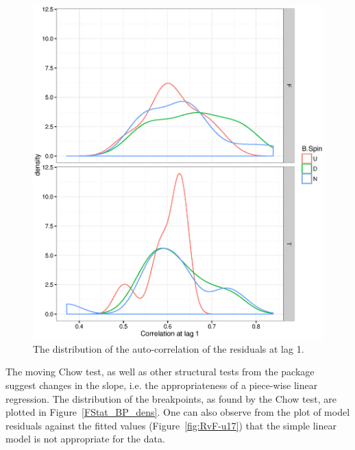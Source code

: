 \documentclass{report}
\begin{document}
\begin{figure}
	\centering
	\includegraphics{ACF1_dens.eps}
	\caption{The distribution of the auto-correlation of the residuals at lag 1.\label{fig:DW2}}
\end{figure}

The moving Chow test, as well as other structural tests from the package~\cite{RStrucchange} suggest changes in the slope, i.e. the appropriateness of a piece-wise linear regression. The distribution of the breakpoints, as found by the Chow test, are plotted in Figure~\ref{FStat_BP_dens}. One can also observe from the plot of model residuals against the fitted values (Figure~\ref{fig:RvF-u17}) that the simple linear model is not appropriate for the data.
\end{document}
